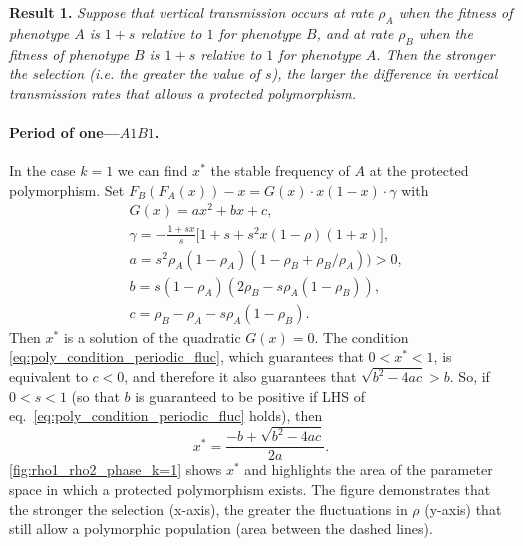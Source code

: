 \documentclass[14pt]{extarticle}
\begin{document}
{\bf Result 1.} {\sl Suppose that vertical transmission occurs at rate $\rho_A$ when the fitness of phenotype $A$ is $1+s$ relative to $1$ for phenotype $B$, and at rate $\rho_B$ when the fitness of phenotype $B$ is $1+s$ relative to $1$ for phenotype $A$.
Then the stronger the selection (i.e. the greater the value of $s$), the larger the difference in vertical transmission rates that allows a protected polymorphism.}

\paragraph{Period of one---$A1B1$.}
In the case  $k=1$ we can find $x^*$ the stable frequency of $A$ at the protected polymorphism.
Set $F_B(F_A(x))-x = G(x) \cdot x (1-x) \cdot \gamma$ with
\begin{equation} \begin{aligned} \label{eq:xstar_periodic_fluc_k=1}
&G(x) = ax^2+bx+c, \\
&\gamma = -\frac{1 + sx}{s} \Big[ 1 + s + s^2 x (1-\rho)(1+x)\Big], \\
&a = s^2 \rho_A (1-\rho_A) (1 - \rho_B + \rho_B/\rho_A)) > 0, \\
&b = s(1-\rho_A)(2\rho_B - s\rho_A(1-\rho_B)), \\
& c = \rho_B - \rho_A - s\rho_A(1-\rho_B).
\end{aligned} \end{equation}
Then $x^*$ is a solution of the quadratic $G(x)=0$.
The condition \eqref{eq:poly_condition_periodic_fluc}, which guarantees that $0 < x^* < 1$, is equivalent to $c<0$, and therefore it also guarantees that $\sqrt{b^2-4ac} > b$.
So, if $0<s<1$ (so that $b$ is guaranteed to be positive if LHS of eq.~\ref{eq:poly_condition_periodic_fluc} holds), then 
\begin{equation}
x^*= \frac{-b+\sqrt{b^2-4ac}}{2a}.
\end{equation}
\autoref{fig:rho1_rho2_phase_k=1} shows $x^*$ and highlights the area of the parameter space in which a protected polymorphism exists.
The figure demonstrates that the stronger the selection (x-axis), the greater the fluctuations in $\rho$  (y-axis) that still allow a polymorphic population (area between the dashed lines).

\end{document}
